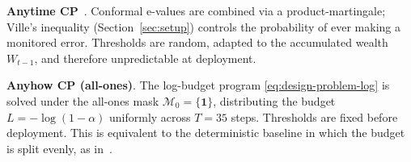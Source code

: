 \documentclass{uai2026} %
\newcommand{\1}{\mathbf{1}}
\newcommand{\mcal}{\mathcal{M}}
\begin{document}






\textbf{Anytime CP}~\citep{gauthier2025values}.
Conformal e-values are combined via a product-martingale; Ville's inequality (Section~\ref{sec:setup}) controls the probability of ever making a monitored error.
Thresholds are random, adapted to the accumulated wealth $W_{t-1}$, and therefore unpredictable at deployment.

\textbf{Anyhow CP (all-ones)}.
The log-budget program \eqref{eq:design-problem-log} is solved under the all-ones mask $\mcal_0 = \{\mathbf{1}\}$, distributing the budget $L = -\log(1-\alpha)$ uniformly across $T = 35$ steps.
Thresholds are fixed before deployment.
This is equivalent to the deterministic baseline in which the budget is split evenly, as in~\citet{gauthier2025values}.
\end{document}
